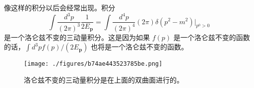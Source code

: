 像这样的积分以后会经常出现。积分
\begin{equation}
\int \frac{d^3p}{(2\pi)^3} \frac{1}{2 E_{\mathbf p}} = \int \frac{d^4 p}{(2\pi)^4} (2\pi) \delta(p^2 - m^2) \bigg|_{p^0>0}
\end{equation}
是一个洛仑兹不变的三动量积分。这是因为如果 $f(p)$ 是一个洛仑兹不变的函数的话，$\int d^3 p f(p)/(2E_{\mathbf p})$ 也将是一个洛仑兹不变的函数。
\begin{figure}[ht]
\centering
\texttt{[image: ./figures/b74ae443523785be.png]}
\caption{洛仑兹不变的三动量积分是在上面的双曲面进行的。} \label{fig_spectr_1}
\end{figure}
